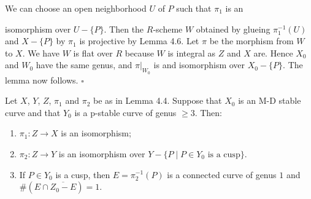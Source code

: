 \documentclass[12pt]{memoir}
\begin{document}
\begin{ptcbp}
We can choose an open neighborhood $U$ of $P$ such that $\pi_1$ is an


isomorphism over $U - \{P\}$. Then the $R$-scheme $W$ obtained by glueing $\pi_1^{-1}(U)$ and $X - \{P\}$ by $\pi_1$ is projective by Lemma 4.6. Let $\pi$ be the morphism from $W$ to $X$. We have $W$ is flat over $R$ because $W$ is integral as $Z$ and $X$ are. Hence $X_0$ and $W_0$ have the same genus, and $\pi|_{W_0}$ is and isomorphism over $X_0 - \{P\}$. The lemma now follows. \hfill$\square$
\end{ptcbp}

\begin{Lem}\label{lem:4.8}
Let $X$, $Y$, $Z$, $\pi_1$ and $\pi_2$ be as in Lemma 4.4. Suppose that $X_0$ is an M-D stable curve and that $Y_0$ is a p-stable curve of genus $\geqslant 3$. Then:

\begin{enumerate}[\upshape(i)]
\item $\pi_1\colon Z \to X$ is an isomorphism;
\item $\pi_2\colon Z \to Y$ is an isomorphism over $Y - \{P \mid P \in Y_0 \text{ is a cusp}\}$.
\item If $P \in Y_0$ is a cusp, then $E = \pi_2^{-1}(P)$ is a connected curve of genus $1$ and $\#(E \cap \overline{Z_0 - E}) = 1$.
\end{enumerate}
\end{Lem}
\end{document}
